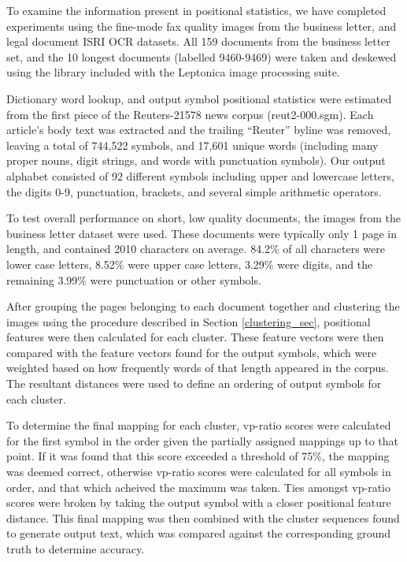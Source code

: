 \documentclass[times, 10pt,twocolumn]{article}
\begin{document}

To examine the information present in positional statistics, we have completed
experiments using the fine-mode fax quality images from the business letter, 
and legal document ISRI OCR datasets\cite{nartker2005}.  All 159 documents from
the business letter set, and the 10 longest documents (labelled 9460-9469) were
taken and deskewed using the library included with the Leptonica image
processing suite\cite{bloomberg2006}.

Dictionary word lookup, and output symbol positional statistics were estimated
from the first piece of the Reuters-21578 news corpus 
(reut2-000.sgm)\cite{lewis2004}.  Each article's body text was extracted and the
trailing ``Reuter'' byline was removed, leaving a total of 744,522 symbols, and
17,601 unique words (including many proper nouns, digit strings, and words with
punctuation symbols).  Our output alphabet consisted of 92 different symbols
including upper and lowercase letters, the digits 0-9, punctuation, brackets, 
and several simple arithmetic operators.

To test overall performance on short, low quality documents, the images from
the business letter dataset were used.  These documents were typically only 1
page in length, and contained 2010 characters on average.  84.2\% of all
characters were lower case letters, 8.52\% were upper case letters, 3.29\% were
digits, and the remaining 3.99\% were punctuation or other symbols.

After grouping the pages belonging to each document together and clustering 
the images using the procedure described in Section \ref{clustering_sec}, 
positional features were then calculated for each cluster.  These feature 
vectors were then compared with the feature vectors found for the output 
symbols, which were weighted based on how frequently words of that length 
appeared in the corpus.  The resultant distances were used to define an 
ordering of output symbols for each cluster.

To determine the final mapping for each cluster, vp-ratio scores were
calculated for the first symbol in the order given the partially assigned
mappings up to that point.  If it was found that this score exceeded a 
threshold of 75\%, the mapping was deemed correct, otherwise vp-ratio scores
were calculated for all symbols in order, and that which acheived the maximum
was taken.  Ties amongst vp-ratio scores were broken by taking the output
symbol with a closer positional feature distance.  This final mapping was then
combined with the cluster sequences found to generate output text, which was
compared against the corresponding ground truth to determine accuracy.
\end{document}
